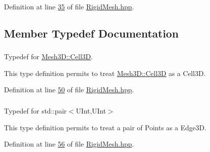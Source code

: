 Definition at line \hyperlink{RigidMesh_8hpp_source_l00035}{35} of file \hyperlink{RigidMesh_8hpp_source}{Rigid\+Mesh.\+hpp}.



\subsection{Member Typedef Documentation}
\subsubsection[{\texorpdfstring{Cell3D}{Cell3D}}]{}\hypertarget{classFVCode3D_1_1Rigid__Mesh_a0895aca7f04d8fc41dd933640735bbcf}{}\label{classFVCode3D_1_1Rigid__Mesh_a0895aca7f04d8fc41dd933640735bbcf}


Typedef for \hyperlink{classFVCode3D_1_1Mesh3D_1_1Cell3D}{Mesh3\+D\+::\+Cell3D}. 

This type definition permits to treat \hyperlink{classFVCode3D_1_1Mesh3D_1_1Cell3D}{Mesh3\+D\+::\+Cell3D} as a Cell3D. 

Definition at line \hyperlink{RigidMesh_8hpp_source_l00050}{50} of file \hyperlink{RigidMesh_8hpp_source}{Rigid\+Mesh.\+hpp}.

\subsubsection[{\texorpdfstring{Edge3D}{Edge3D}}]{}\hypertarget{classFVCode3D_1_1Rigid__Mesh_a396039ac2943822c4652967ce1849c9f}{}\label{classFVCode3D_1_1Rigid__Mesh_a396039ac2943822c4652967ce1849c9f}


Typedef for std\+::pair$<$\+U\+Int,\+U\+Int$>$ 

This type definition permits to treat a pair of Points as a Edge3D. 

Definition at line \hyperlink{RigidMesh_8hpp_source_l00056}{56} of file \hyperlink{RigidMesh_8hpp_source}{Rigid\+Mesh.\+hpp}.

